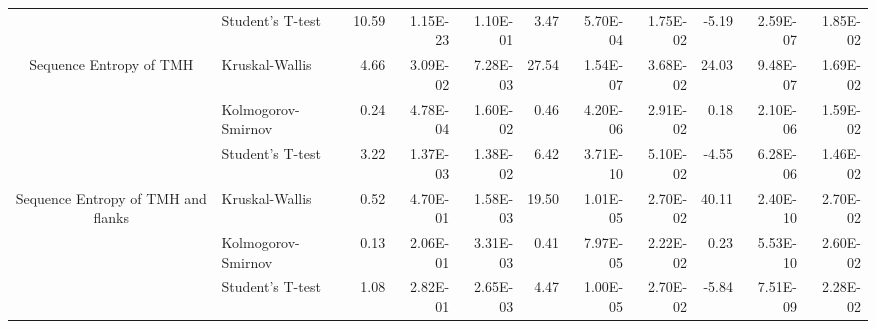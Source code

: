 \begin{table}[htbp]
\begin{tabular}{clrrrrrrrrr}
          &  Student's T-test & 10.59 & 1.15E-23 & 1.10E-01 & 3.47  & 5.70E-04 & 1.75E-02 & -5.19 & 2.59E-07 & 1.85E-02 \\
    \multirow{3}[0]{*}{Sequence Entropy of TMH } &  Kruskal-Wallis & 4.66  & 3.09E-02 & 7.28E-03 & 27.54 & 1.54E-07 & 3.68E-02 & 24.03 & 9.48E-07 & 1.69E-02 \\
          &  Kolmogorov-Smirnov & 0.24  & 4.78E-04 & 1.60E-02 & 0.46  & 4.20E-06 & 2.91E-02 & 0.18  & 2.10E-06 & 1.59E-02 \\
          &  Student's T-test & 3.22  & 1.37E-03 & 1.38E-02 & 6.42  & 3.71E-10 & 5.10E-02 & -4.55 & 6.28E-06 & 1.46E-02 \\
    \multirow{3}[0]{*}{Sequence Entropy of TMH and flanks } &  Kruskal-Wallis & 0.52  & 4.70E-01 & 1.58E-03 & 19.50 & 1.01E-05 & 2.70E-02 & 40.11 & 2.40E-10 & 2.70E-02 \\
          &  Kolmogorov-Smirnov & 0.13  & 2.06E-01 & 3.31E-03 & 0.41  & 7.97E-05 & 2.22E-02 & 0.23  & 5.53E-10 & 2.60E-02 \\
          &  Student's T-test & 1.08  & 2.82E-01 & 2.65E-03 & 4.47  & 1.00E-05 & 2.70E-02 & -5.84 & 7.51E-09 & 2.28E-02 \\
    \end{tabular}%
  \label{tab:addlabel}%
\end{table}%
